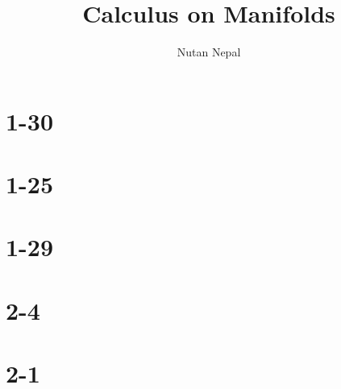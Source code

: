 


\title{Calculus on Manifolds}
\author{Nutan Nepal}



\maketitle

\section{1-30}

\textbf{}
\section{1-25}


\section{1-29}


\section{2-4}


\section{}


\section{2-1}


